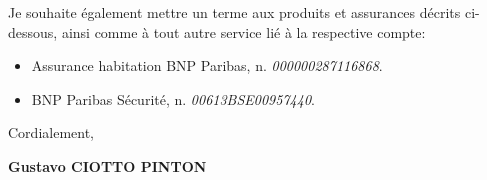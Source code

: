 \documentclass[12pt, a4paper]{article}
\begin{document}
\vspace{12pt}

Je souhaite également mettre un terme aux produits et assurances décrits
ci-dessous, ainsi comme à tout autre service lié à la respective compte:

\vspace{12pt}

\begin{itemize}
  \item Assurance habitation BNP Paribas, n. \textit{000000287116868}.
  \item BNP Paribas Sécurité, n. \textit{00613BSE00957440}.
\end{itemize}

% 
% 
% 
% 
% 



\begin{flushright}

Cordialement,

\vspace{48pt}

\textbf{Gustavo CIOTTO PINTON}
\end{flushright}
\end{document}
